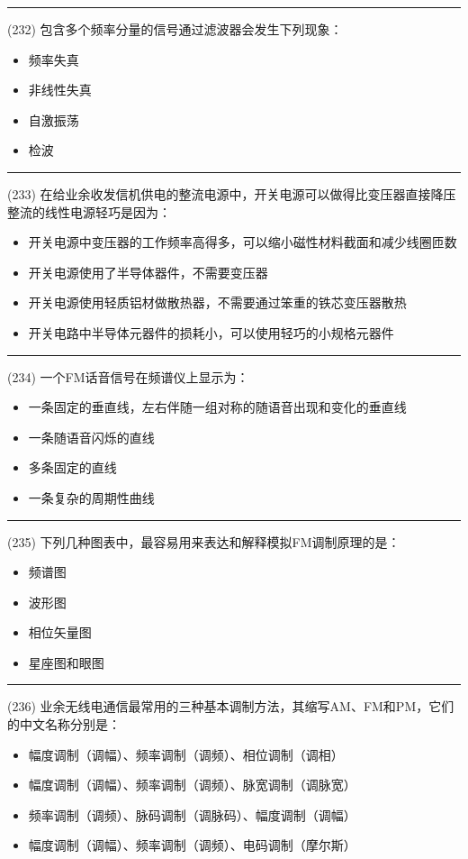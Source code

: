 \documentclass[twocolumn]{ctexart}  %
\begin{document}
\noindent\rule{0.5\textwidth}{1pt}
\heiti (232) 包含多个频率分量的信号通过滤波器会发生下列现象： \songti {\color{gray} [LK0572] }
\begin{itemize}
	\item  频率失真
	\item  非线性失真
	\item  自激振荡
	\item  检波
\end{itemize}


\noindent\rule{0.5\textwidth}{1pt}
\heiti (233) 在给业余收发信机供电的整流电源中，开关电源可以做得比变压器直接降压整流的线性电源轻巧是因为： \songti {\color{gray} [LK0689] }
\begin{itemize}
	\item  开关电源中变压器的工作频率高得多，可以缩小磁性材料截面和减少线圈匝数
	\item  开关电源使用了半导体器件，不需要变压器
	\item  开关电源使用轻质铝材做散热器，不需要通过笨重的铁芯变压器散热
	\item  开关电路中半导体元器件的损耗小，可以使用轻巧的小规格元器件
\end{itemize}


\noindent\rule{0.5\textwidth}{1pt}
\heiti (234) 一个FM话音信号在频谱仪上显示为： \songti {\color{gray} [LK0713] }
\begin{itemize}
	\item  一条固定的垂直线，左右伴随一组对称的随语音出现和变化的垂直线
	\item  一条随语音闪烁的直线
	\item  多条固定的直线
	\item  一条复杂的周期性曲线
\end{itemize}


\noindent\rule{0.5\textwidth}{1pt}
\heiti (235) 下列几种图表中，最容易用来表达和解释模拟FM调制原理的是： \songti {\color{gray} [LK0716] }
\begin{itemize}
	\item  频谱图
	\item  波形图
	\item  相位矢量图
	\item  星座图和眼图
\end{itemize}


\noindent\rule{0.5\textwidth}{1pt}
\heiti (236) 业余无线电通信最常用的三种基本调制方法，其缩写AM、FM和PM，它们的中文名称分别是： \songti {\color{gray} [LK0784] }
\begin{itemize}
	\item  幅度调制（调幅）、频率调制（调频）、相位调制（调相）
	\item  幅度调制（调幅）、频率调制（调频）、脉宽调制（调脉宽）
	\item  频率调制（调频）、脉码调制（调脉码）、幅度调制（调幅）
	\item  幅度调制（调幅）、频率调制（调频）、电码调制（摩尔斯）
\end{itemize}
\end{document}
